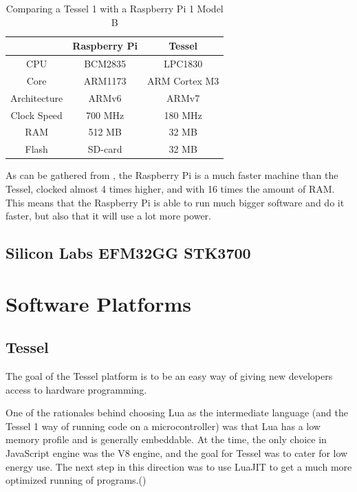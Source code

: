 \begin{table}[h]
\centering
\begin{tabular}{| c | c | c |}
\hline
            & Raspberry Pi  & Tessel        \\ \hline
CPU         & BCM2835       & LPC1830       \\ \hline
Core        & ARM1173       & ARM Cortex M3 \\ \hline
Architecture& ARMv6         & ARMv7         \\ \hline
Clock Speed & 700 MHz       & 180 MHz       \\ \hline
RAM         & 512 MB        & 32 MB         \\ \hline
Flash       & SD-card       & 32 MB         \\
\hline
\end{tabular}
\caption{Comparing a Tessel 1 with a Raspberry Pi 1 Model B}
\label{tab:specs}
\end{table}


As can be gathered from , the Raspberry Pi is a much faster machine than the Tessel, clocked almost 4 times higher, and with 16 times the amount of RAM.
This means that the Raspberry Pi is able to run much bigger software and do it faster, but also that it will use a lot more power.

\subsection{Silicon Labs EFM32GG STK3700}

\section{Software Platforms}
\subsection{Tessel}
The goal of the Tessel platform is to be an easy way of giving new developers access to hardware programming.

One of the rationales behind choosing Lua as the intermediate language (and the Tessel 1 way of running code on a microcontroller) was that Lua has a low memory profile and is generally embeddable.
At the time, the only choice in JavaScript engine was the V8 engine, and the goal for Tessel was to cater for low energy use.
The next step in this direction was to use LuaJIT to get a much more optimized running of programs.(\cite{newengine})

